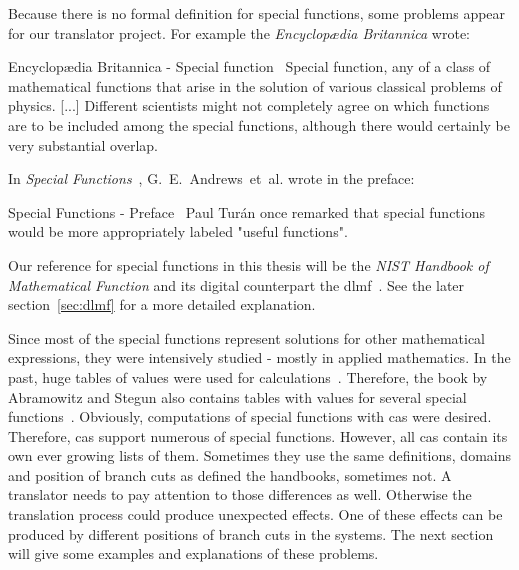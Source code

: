 Because there is no formal definition for special functions, some problems appear for our translator project. For example the \textit{Encyclop\ae{dia} Britannica} wrote:
\begin{myQuote}{Encyclop\ae{dia} Britannica - Special function~\parencite{SpecialFunctions:britannica}}
	Special function, any of a class of mathematical functions that arise in the solution of various classical problems of physics. [...] Different scientists might not completely agree on which functions are to be included among the special functions, although there would certainly be very substantial overlap.
\end{myQuote}

In \textit{Special Functions}~\parencite{SF:Book}, G.~E.~Andrews~et~al. wrote in the preface:
\begin{myQuote}{Special Functions - Preface~\parencite{SF:Book}}
Paul Tur\'an once remarked that special functions would be more appropriately labeled "useful functions".
\end{myQuote}

Our reference for special functions in this thesis will be the \textit{NIST Handbook of Mathematical Function} and its digital counterpart the \gls{dlmf}~\parencite{NIST:DLMF}. See the later section~\ref{sec:dlmf} for a more detailed explanation. 

Since most of the special functions represent solutions for other mathematical expressions, they were intensively studied - mostly in applied mathematics. In the past, huge tables of values were used for calculations~\parencite{Tables}. Therefore, the book by Abramowitz and Stegun also contains tables with values for several special functions~\parencite{AbramowitzStegun}. Obviously, computations of special functions with \gls{cas} were desired. Therefore, \gls{cas} support numerous of special functions. However, all \gls{cas} contain its own ever growing lists of them. Sometimes they use the same definitions, domains and position of branch cuts as defined the handbooks, sometimes not. A translator needs to pay attention to those differences as well. Otherwise the translation process could produce unexpected effects. One of these effects can be produced by different positions of branch cuts in the systems. The next section will give some examples and explanations of these problems.

